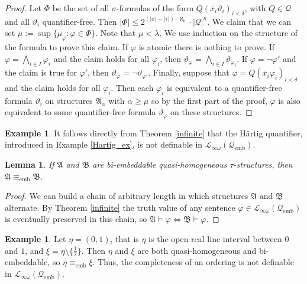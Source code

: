 \documentclass{ndjflart}
\theoremstyle{plain}
\newtheorem{lemma}[conjecture]{Lemma}
\theoremstyle{definition}
\newtheorem{example}[conjecture]{Example}
\numberwithin{equation}{section}
\DeclareMathOperator{\emb}{emb}
\begin{document}
\begin{proof}
Let $\Phi$ be the set of all $\sigma$-formulas of the form
$Q(\overline{x}_i\vartheta_i)_{i<\delta}$,
with $Q\in\mathcal{Q}$ and all $\vartheta_i$ quantifier-free.
Then
$|\Phi| \leq 2^{(|\sigma| + |\tau|) \cdot \aleph_0} \cdot |\mathcal{Q}|^{\kappa}$.
We claim that we can set
$\mu := \sup\{\mu_{\varphi} \colon \varphi \in \Phi \}$.
Note that $\mu < \lambda$.
We use induction on the structure of the formula to prove this claim.
If $\varphi$ is atomic there is nothing to prove.
If $\varphi = \bigwedge_{i \in I} \varphi_i$ and the claim holds for all
$\varphi_i$, then
$\vartheta_{\varphi} = \bigwedge_{i\in I}\vartheta_{\varphi_i}$.
If $\varphi = \neg \varphi'$ and the claim is true for $\varphi'$,
then $\vartheta_{\varphi} = \neg \vartheta_{\varphi'}$.
Finally, suppose that $\varphi = Q(\overline{x}_i \varphi_i)_{i < \delta}$
and the claim holds for all $\varphi_i$.
Then each $\varphi_i$ is equivalent to a quantifier-free formula $\vartheta_i$
on structures $\mathfrak{A}_{\alpha}$ with $\alpha \geq \mu$ so by the first part
of the proof, $\varphi$ is also equivalent to some quantifier-free formula
$\vartheta_{\varphi}$ on these structures.
\end{proof}

\begin{example}\label{Hartig}
It follows directly from Theorem \ref{infinite} that
the H\"artig quantifier, introduced in Example \ref{Hartig_ex}, is not definable
in $\mathcal{L}_{\infty\omega}(\mathcal{Q}_{\emb})$.
\end{example}

\begin{lemma}
If $\mathfrak{A}$ and $\mathfrak{B}$ are bi-embeddable quasi-homogeneous
$\tau$-structures, then $\mathfrak{A} \equiv_{\emb} \mathfrak{B}$.
\end{lemma}
\begin{proof}
We can build a chain of arbitrary length in which structures $\mathfrak{A}$ and
$\mathfrak{B}$ alternate.
By Theorem \ref{infinite} the truth value of any sentence
$\varphi \in \mathcal{L}_{\infty\omega}(\mathcal{Q}_{\emb})$
is eventually preserved in this chain, so
$\mathfrak{A} \vDash \varphi \Leftrightarrow \mathfrak{B} \vDash \varphi$.
\end{proof}

\begin{example}\label{completeness}
Let $\eta = (0,1)$, that is $\eta$ is the open real line interval between $0$
and $1$, and $\xi = \eta \setminus \{\frac{1}{2}\}$.
Then $\eta$ and $\xi$ are both quasi-homogeneous and bi-embeddable, so
$\eta \equiv_{\emb} \xi$.
Thus, the completeness of an ordering is not definable in
$\mathcal{L}_{\infty \omega}(\mathcal{Q}_{\emb})$.
\end{example}
\end{document}
